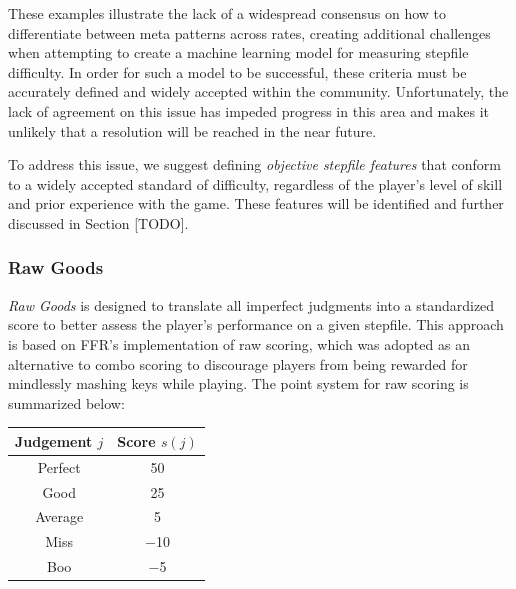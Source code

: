 \begin{center}
\begin{table}[ht]
\begin{minipage}{.5\linewidth}
			\medskip
			\vspace{52.5pt}
			\captionsetup{width=0.75\linewidth}
			\label{example-jacks}
		\end{minipage}
	\end{table}
\end{center}


\vspace{-7.75mm }

These examples illustrate the lack of a widespread consensus on how to differentiate between meta patterns across rates, creating additional challenges when attempting to create a machine learning model for measuring stepfile difficulty. In order for such a model to be successful, these criteria must be accurately defined and widely accepted within the community. Unfortunately, the lack of agreement on this issue has impeded progress in this area and makes it unlikely that a resolution will be reached in the near future.

\vspace{2mm}

To address this issue, we suggest defining \textit{objective stepfile features} that conform to a widely accepted standard of difficulty, regardless of the player's level of skill and prior experience with the game. These features will be identified and further discussed in Section [TODO].

\subsubsection{Raw Goods}

\textit{Raw Goods} is designed to translate all imperfect judgments into a standardized score to better assess the player's performance on a given stepfile. This approach is based on FFR's implementation of raw scoring, which was adopted as an alternative to combo scoring to discourage players from being rewarded for mindlessly mashing keys while playing. The point system for raw scoring is summarized below:

\begin{center}
	\begin{tabular}{c@{\hskip 10mm}c}
		\hspace{5mm} \textbf{Judgement} $j$ \hspace{5mm} & \textbf{Score} $s(j)$ \\
		\hline
		
		Perfect                               & 50                    \\
		Good                                  & 25                    \\
		Average                               & 5                     \\
		Miss                                  & $-$10                 \\
		Boo                                   & $-$5                  \\
	\end{tabular}
\end{center}

